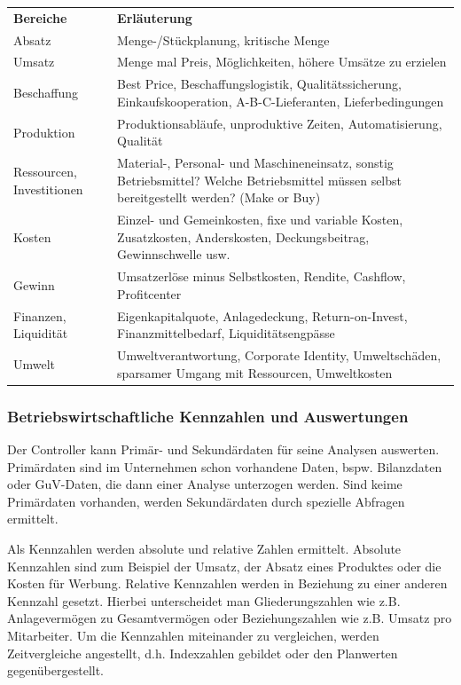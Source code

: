 \begin{tabular}{	p{}
				p{}}
	{\bf Bereiche} & {\bf Erläuterung}\\
	Absatz & Menge-/Stückplanung, kritische Menge\\
	Umsatz & Menge mal Preis, Möglichkeiten, höhere Umsätze zu erzielen\\
	Beschaffung & Best Price, Beschaffungslogistik, Qualitätssicherung, Einkaufskooperation, A-B-C-Lieferanten, Lieferbedingungen\\
	Produktion & Produktionsabläufe, unproduktive Zeiten, Automatisierung, Qualität\\
	Ressourcen, Investitionen & Material-, Personal- und Maschineneinsatz, sonstig Betriebsmittel? Welche Betriebsmittel müssen selbst bereitgestellt werden? (Make or Buy)\\
	Kosten & Einzel- und Gemeinkosten, fixe und variable Kosten, Zusatzkosten, Anderskosten, Deckungsbeitrag, Gewinnschwelle usw.\\
	Gewinn & Umsatzerlöse minus Selbstkosten, Rendite, Cashflow, Profitcenter\\
	Finanzen, Liquidität & Eigenkapitalquote, Anlagedeckung, Return-on-Invest, Finanzmittelbedarf, Liquiditätsengpässe\\
	Umwelt & Umweltverantwortung, Corporate Identity, Umweltschäden, sparsamer Umgang mit Ressourcen, Umweltkosten\\
\end{tabular}\newline

\subsubsection{Betriebswirtschaftliche Kennzahlen und Auswertungen}
Der Controller kann Primär- und Sekundärdaten für seine Analysen auswerten. Primärdaten sind im Unternehmen schon vorhandene Daten, bspw. Bilanzdaten oder GuV-Daten, die dann einer Analyse unterzogen werden. Sind keime Primärdaten vorhanden, werden Sekundärdaten durch spezielle Abfragen ermittelt.

Als Kennzahlen werden absolute und relative Zahlen ermittelt. Absolute Kennzahlen sind zum Beispiel der Umsatz, der Absatz eines Produktes oder die Kosten für Werbung. Relative Kennzahlen werden in Beziehung zu einer anderen Kennzahl gesetzt. Hierbei unterscheidet man Gliederungszahlen wie z.B. Anlagevermögen zu Gesamtvermögen oder Beziehungszahlen wie z.B. Umsatz pro Mitarbeiter. Um die Kennzahlen miteinander zu vergleichen, werden Zeitvergleiche angestellt, d.h. Indexzahlen gebildet oder den Planwerten gegenübergestellt.

